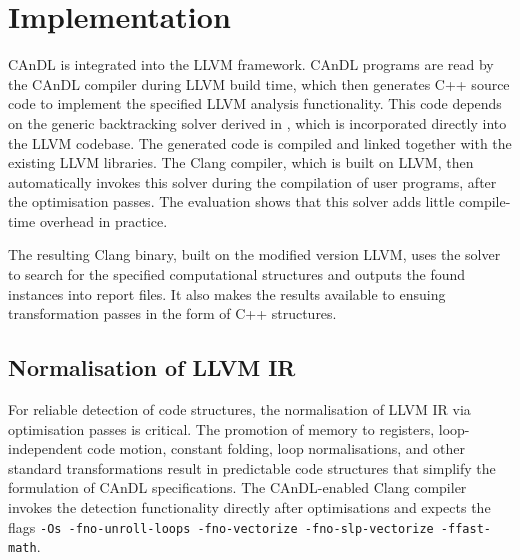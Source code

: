 \section{Implementation}

    CAnDL is integrated into the LLVM framework.
    CAnDL programs are read by the CAnDL compiler during LLVM build time, which
    then generates C++ source code to implement the specified LLVM analysis
    functionality.
    This code depends on the generic backtracking solver derived in
    , which is incorporated directly into the LLVM
    codebase.
    The generated code is compiled and linked together with the existing LLVM
    libraries.
    The Clang compiler, which is built on LLVM, then automatically invokes this
    solver during the compilation of user programs, after the optimisation
    passes.
    The evaluation shows that this solver adds little compile-time overhead in
    practice.

    The resulting Clang binary, built on the modified version LLVM, uses the
    solver to search for the specified computational structures and outputs the
    found instances into report files.
    It also makes the results available to ensuing transformation passes in the
    form of C++ structures.

\subsection{Normalisation of LLVM IR}

    For reliable detection of code structures, the normalisation of LLVM IR via
    optimisation passes is critical.
    The promotion of memory to registers, loop-independent code motion,
    constant folding, loop normalisations, and other standard transformations
    result in predictable code structures that simplify the formulation of CAnDL
    specifications.
    The CAnDL-enabled Clang compiler invokes the detection functionality
    directly after optimisations and expects the flags
    {\tt -Os -fno-unroll-loops -fno-vectorize -fno-slp-vectorize -ffast-math}.

